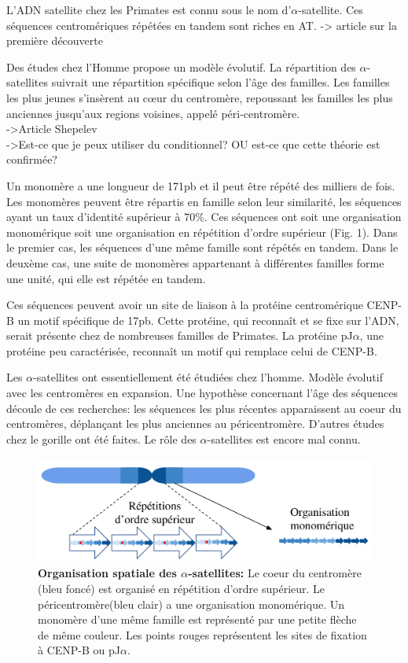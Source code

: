 \documentclass[12pt,a4paper]{article}
\begin{document}
L'ADN satellite chez les Primates est connu sous le nom d'$\alpha$-satellite. Ces séquences centromériques répétées en tandem sont riches en AT. 
-> article sur la première découverte

Des études chez l'Homme propose un modèle évolutif. La répartition des $\alpha$-satellites suivrait une répartition spécifique selon l'âge des familles. Les familles les plus jeunes s'insèrent au cœur du centromère, repoussant les familles les plus anciennes jusqu'aux regions voisines, appelé péri-centromère.\\
->Article Shepelev\\
->Est-ce que je peux utiliser du conditionnel? OU est-ce que cette théorie est confirmée?

Un monomère a une longueur de 171pb et il peut être répété des milliers de fois. Les monomères peuvent être répartis en famille selon leur similarité, les séquences ayant un taux d'identité supérieur à 70\%. Ces séquences ont soit une organisation monomérique soit une organisation en répétition d'ordre supérieur (Fig. 1). Dans le premier cas, les séquences d'une même famille sont répétés en tandem. Dans le deuxème cas, une suite de monomères appartenant à différentes familles forme une unité, qui elle est répétée en tandem. 



Ces séquences peuvent avoir un site de liaison à la protéine centromérique CENP-B un motif spécifique de 17pb. Cette protéine, qui reconnaît et se fixe sur l'ADN, serait présente chez de nombreuses familles de Primates. La protéine pJ$\alpha$, une protéine peu caractérisée, reconnaît un motif qui remplace celui de CENP-B.

Les $\alpha$-satellites ont essentiellement été étudiées chez l'homme. Modèle évolutif avec les centromères en expansion. Une hypothèse concernant l'âge des séquences découle de ces recherches: les séquences les plus récentes apparaissent au coeur du centromères, déplançant les plus anciennes au péricentromère. D'autres études chez le gorille ont été faites. Le rôle des $\alpha$-satellites est encore mal connu. 

\begin{figure}
	\center
		\includegraphics[height=3.5cm, width=12cm]{img/AS_organization.png}
		\caption{\textbf{Organisation spatiale des $\alpha$-satellites:} Le coeur du centromère (bleu foncé) est organisé en répétition d'ordre supérieur. Le péricentromère(bleu clair) a une organisation monomérique. Un monomère d'une même famille est représenté par une petite flèche de même couleur. Les points rouges représentent les sites de fixation à CENP-B ou pJ$\alpha$.}
\end{figure}
\end{document}
